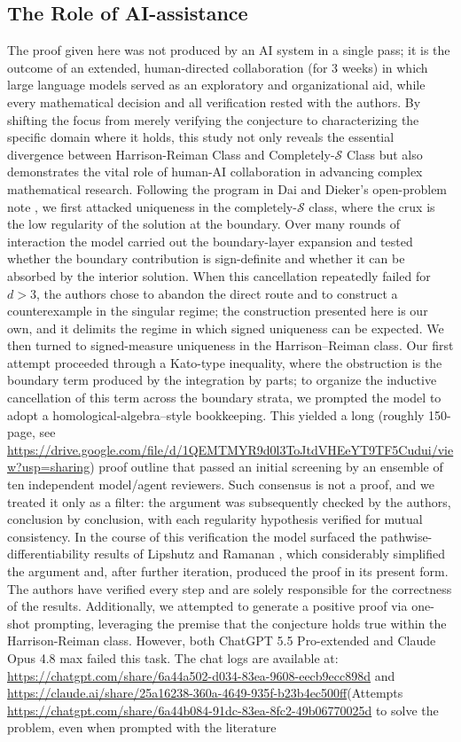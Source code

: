 \documentclass[aihp]{imsart}
\numberwithin{equation}{section}
\theoremstyle{plain}
\theoremstyle{definition}
\newcommand{\1}{\mathbf 1}
\begin{document}
\subsection*{The Role of AI-assistance} The proof given here was not produced by an AI system in a single pass; it is the outcome of an extended, human-directed collaboration (for 3 weeks) in which large language models served as an exploratory and organizational aid, while every mathematical decision and all verification rested with the authors. By shifting the focus from merely verifying the conjecture to characterizing the specific domain where it holds, this study not only reveals the essential divergence between Harrison-Reiman Class and Completely-$\mathcal{S}$ Class but also demonstrates the vital role of human-AI collaboration in advancing complex mathematical research. Following the program in Dai and Dieker's open-problem note \cite{DaiDieker2011}, we first attacked uniqueness in the completely-$\mathcal{S}$  class, where the crux is the low regularity of the solution at the boundary. Over many rounds of interaction the model carried out the boundary-layer expansion and tested whether the boundary contribution is sign-definite and whether it can be absorbed by the interior solution. When this cancellation repeatedly failed for $d>3$, the authors chose to abandon the direct route and to construct a counterexample in the singular regime; the construction presented here is our own, and it delimits the regime in which signed uniqueness can be expected. We then turned to signed-measure uniqueness in the Harrison–Reiman class. Our first attempt proceeded through a Kato-type inequality, where the obstruction is the boundary term produced by the integration by parts; to organize the inductive cancellation of this term across the boundary strata, we prompted the model to adopt a homological-algebra–style bookkeeping. This yielded a long (roughly 150-page, see \url{https://drive.google.com/file/d/1QEMTMYR9d0l3ToJtdVHEeYT9TF5Cudui/view?usp=sharing}) proof outline that passed an initial screening by an ensemble of ten independent model/agent reviewers. Such consensus is not a proof, and we treated it only as a filter: the argument was subsequently checked by the authors, conclusion by conclusion, with each regularity hypothesis verified for mutual consistency. In the course of this verification the model surfaced the pathwise-differentiability results of Lipshutz and Ramanan \cite{LipshutzRamanan2018}, which considerably simplified the argument and, after further iteration, produced the proof in its present form. The authors have verified every step and are solely responsible for the correctness of the results. Additionally, we attempted to generate a positive proof via one-shot prompting, leveraging the premise that the conjecture holds true within the Harrison-Reiman class. However, both ChatGPT 5.5 Pro-extended and Claude Opus 4.8 max failed this task. The chat logs are available at: \url{https://chatgpt.com/share/6a44a502-d034-83ea-9608-eecb9ecc898d} and \url{https://claude.ai/share/25a16238-360a-4649-935f-b23b4ec500ff}(Attempts \url{https://chatgpt.com/share/6a44b084-91dc-83ea-8fc2-49b06770025d} to solve the problem, even when prompted with the literature 
\end{document}
